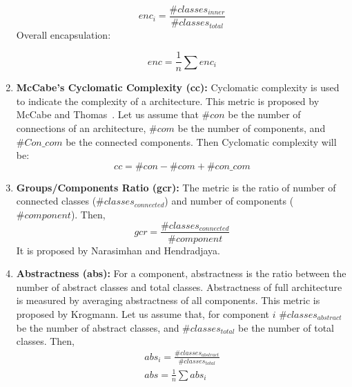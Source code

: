 \documentclass[letterpaper, 10 pt, conference]{ieeeconf}  %
\begin{document}
\begin{enumerate}
 \begin{displaymath}
enc_{i}=\frac{\#classes_{inner}}{\#classes_{total}} 
 \end{displaymath}
Overall encapsulation:

\begin{equation} \label{enc_eq}
enc=\frac{1}{n}\sum{enc_{i}}
\end{equation}



\item \textbf{ McCabe's Cyclomatic Complexity (cc):} Cyclomatic complexity is  used to indicate the complexity of a architecture. This metric is proposed by McCabe and Thomas~\cite{mccabe1976complexity}. Let us assume that  $\#con$ be the number of connections of  an architecture, $\#com$ be the number of components, and  $\#Con\_com$ be the connected components. Then Cyclomatic complexity will be:
\begin{equation}\label{cc_eq}
cc=\#con - \#com + \#con\_com 
\end{equation}

\item \textbf{Groups/Components Ratio (gcr):}
The metric is the ratio of number of connected classes ($\#classes_{connected}$) and number of components ($\#component$). Then,
\begin{equation} \label{gcr_eq}
gcr=\frac{\#classes_{connected}}{\#component}
\end{equation}
It is proposed by  Narasimhan and Hendradjaya\cite{narasimhan2007some}.

\item \textbf{Abstractness (abs): }For a component, abstractness is the ratio between the number of abstract classes and total classes. Abstractness of full architecture is measured by averaging abstractness of all components. This metric is proposed by Krogmann\cite{krogmann2012reconstruction}. Let us assume that, for component $i$ $\#classes_{abstract}$ be the number of abstract classes, and $\#classes_{total}$ be the number of total classes. Then,
\begin{equation}\label{abs_eq}
 \begin{array}{l}
abs_{i}=\frac{\#classes_{abstract}}{\#classes_{total}} \\
abs=\frac{1}{n}\sum{abs_{i}}
\end{array}
\end{equation}








\end{enumerate}
\end{document}
